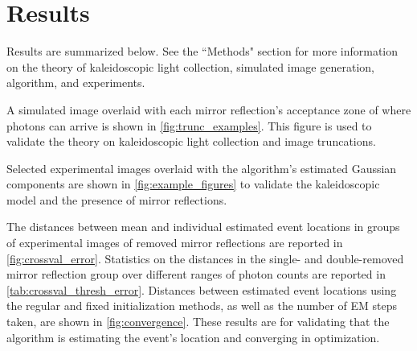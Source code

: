 \section{Results}
\iffalse
We test a kaleidoscopic scintillator with a square pyramid geometry (four side-surfaces).
An image is assumed to contain the event and at most one mirror reflection per 
side-surface of the kaleidoscope.
Each event and mirror reflection appears as a defocused point source of light in 
the image.
Light from mirror reflections may be truncated along lines on the sensor 
corresponding to mirrors' edges or completely removed, as described by the theory 
introduced in the ``Methods" section.
Our algorithm determines which mirror reflections are present in an image and 
estimates the event's location by running the EM algorithm on a Gaussian mixture 
model (GMM) parameterized in terms of the event's location.
\fi

Results are summarized below. See the ``Methods" section for more information on 
the theory of kaleidoscopic light collection, simulated image generation, 
algorithm, and experiments.

A simulated image overlaid with each mirror reflection's acceptance zone of where 
photons can arrive is shown in \cref{fig:trunc_examples}. 
This figure is used to validate the theory on kaleidoscopic light collection and 
image truncations. 

Selected experimental images overlaid with the algorithm's estimated Gaussian 
components are shown in \cref{fig:example_figures} to validate the kaleidoscopic 
model and the presence of mirror reflections.

The distances between mean and individual estimated event locations in groups of 
experimental images of removed mirror reflections are reported in \cref{fig:crossval_error}.
Statistics on the distances in the single- and double-removed mirror reflection 
group over different ranges of photon counts are reported in \cref{tab:crossval_thresh_error}.
Distances between estimated event locations using the regular and fixed 
initialization methods, as well as the number of EM steps taken, are shown in \cref{fig:convergence}.
These results are for validating that the algorithm is estimating the event's 
location and converging in optimization.


